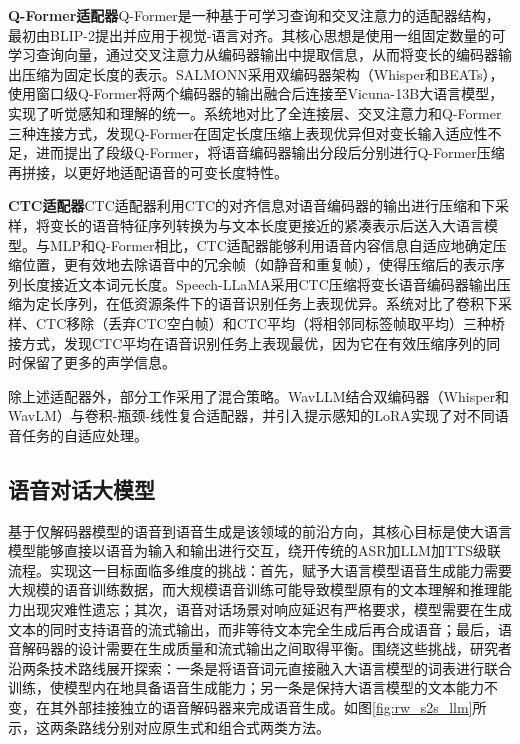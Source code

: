 \textbf{Q-Former适配器}\quad Q-Former是一种基于可学习查询和交叉注意力的适配器结构，最初由BLIP-2\citep{li2023blip2}提出并应用于视觉-语言对齐。其核心思想是使用一组固定数量的可学习查询向量，通过交叉注意力从编码器输出中提取信息，从而将变长的编码器输出压缩为固定长度的表示。SALMONN\citep{tang2024salmonn}采用双编码器架构（Whisper和BEATs），使用窗口级Q-Former将两个编码器的输出融合后连接至Vicuna-13B大语言模型，实现了听觉感知和理解的统一。\citet{yu2024connecting}系统地对比了全连接层、交叉注意力和Q-Former三种连接方式，发现Q-Former在固定长度压缩上表现优异但对变长输入适应性不足，进而提出了段级Q-Former，将语音编码器输出分段后分别进行Q-Former压缩再拼接，以更好地适配语音的可变长度特性。

\textbf{CTC适配器}\quad CTC适配器利用CTC的对齐信息对语音编码器的输出进行压缩和下采样，将变长的语音特征序列转换为与文本长度更接近的紧凑表示后送入大语言模型。与MLP和Q-Former相比，CTC适配器能够利用语音内容信息自适应地确定压缩位置，更有效地去除语音中的冗余帧（如静音和重复帧），使得压缩后的表示序列长度接近文本词元长度。Speech-LLaMA\citep{wu2023decoder}采用CTC压缩将变长语音编码器输出压缩为定长序列，在低资源条件下的语音识别任务上表现优异。\citet{hono-etal-2024-integrating}系统对比了卷积下采样、CTC移除（丢弃CTC空白帧）和CTC平均（将相邻同标签帧取平均）三种桥接方式，发现CTC平均在语音识别任务上表现最优，因为它在有效压缩序列的同时保留了更多的声学信息。

除上述适配器外，部分工作采用了混合策略。WavLLM\citep{hu2024wavllm}结合双编码器（Whisper和WavLM）与卷积-瓶颈-线性复合适配器，并引入提示感知的LoRA实现了对不同语音任务的自适应处理。


\subsection{语音对话大模型}\label{sec:rw_deconly_s2s}

基于仅解码器模型的语音到语音生成是该领域的前沿方向，其核心目标是使大语言模型能够直接以语音为输入和输出进行交互，绕开传统的ASR加LLM加TTS级联流程。实现这一目标面临多维度的挑战：首先，赋予大语言模型语音生成能力需要大规模的语音训练数据，而大规模语音训练可能导致模型原有的文本理解和推理能力出现灾难性遗忘；其次，语音对话场景对响应延迟有严格要求，模型需要在生成文本的同时支持语音的流式输出，而非等待文本完全生成后再合成语音；最后，语音解码器的设计需要在生成质量和流式输出之间取得平衡。围绕这些挑战，研究者沿两条技术路线展开探索：一条是将语音词元直接融入大语言模型的词表进行联合训练，使模型内在地具备语音生成能力；另一条是保持大语言模型的文本能力不变，在其外部挂接独立的语音解码器来完成语音生成。如图\ref{fig:rw_s2s_llm}所示，这两条路线分别对应原生式和组合式两类方法。

